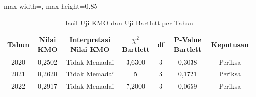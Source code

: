 \begin{table}[H]
\centering
\caption{Hasil Uji KMO dan Uji Bartlett per Tahun} \label{tab:sample1kmo_bartlett}
\begin{adjustbox}{max width=\textwidth, max height=0.85\textheight}
\begin{tabular}{|c|c|c|c|c|c|c|}
\hline
\textbf{Tahun} & \textbf{Nilai KMO} & \textbf{Interpretasi Nilai KMO} & \textbf{$\chi^2$ Bartlett} & \textbf{df} & \textbf{P-Value Bartlett} & \textbf{Keputusan} \\
\hline
2020 & 0,2502 & Tidak Memadai & 3,6300 & 3 & 0,3038 & Periksa \\
2021 & 0,2620 & Tidak Memadai & 5 & 3 & 0,1721 & Periksa \\
2022 & 0,2917 & Tidak Memadai & 7,2000 & 3 & 0,0659 & Periksa \\
\hline
\end{tabular}
\end{adjustbox}
\end{table}